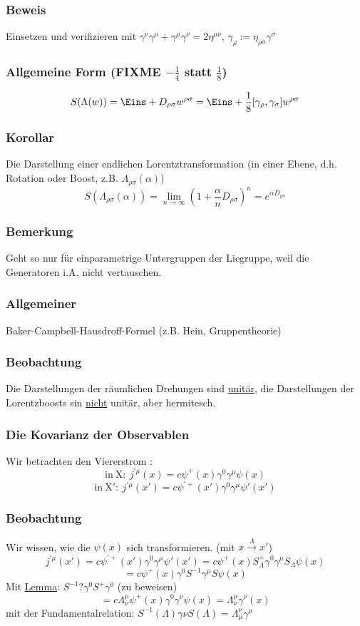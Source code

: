 \documentclass[twoside,a4paper]{scrartcl}
\renewcommand{\1}{\mathds{1}}
\newcommand{\ra}{\rightarrow}
\renewcommand{\L}{\Lambda}
\begin{document}
\subsubsection*{Beweis}
Einsetzen und verifizieren mit $\gamma^\nu\gamma^\mu+\gamma^\mu\gamma^\nu=2\eta^{\mu\nu}$, $\gamma_\rho:=\eta_{\rho\sigma}\gamma^\sigma$
\subsubsection*{Allgemeine Form (FIXME $-\frac{1}{4}$ statt $\frac{1}{8}$)}
$$S(\L(w))=\Eins+D_{\rho\sigma}w^{\rho\sigma}=\Eins+\frac{1}{8}[\gamma_\rho,\gamma_\sigma]w^{\rho\sigma}$$
\subsubsection*{Korollar}
Die Darstellung einer endlichen Lorentztransformation (in einer Ebene, d.h. Rotation oder Boost, z.B. $\L_{\rho\sigma}(\alpha)$)
$$S(\L_{\rho\sigma}(\alpha))=\lim_{n\ra \infty} (1+\frac{\alpha}{n} D_{\rho\sigma})^n=e^{\alpha D_{\rho\sigma}}$$
\subsubsection*{Bemerkung}
Geht so nur für einparametrige Untergruppen der Liegruppe, weil die Generatoren i.A. nicht vertauschen.
\subsubsection*{Allgemeiner}
Baker-Campbell-Hausdroff-Formel (z.B.  Hein, Gruppentheorie)
\subsubsection*{Beobachtung}
Die Darstellungen der räumlichen Drehungen sind \underline{unitär}, die Darstellungen der Lorentzboosts sin \underline{nicht} unitär, aber hermitesch.
\subsubsection{Die Kovarianz der Observablen}
Wir betrachten den Viererstrom :
$$\mathrm{in \ X: \ } j^{'\mu}(x)=c\psi^+(x)\gamma^0 \gamma^\mu \psi(x)$$
$$\mathrm{in \ X': \ } j^{'\mu}(x')=c\psi^{'+}(x')\gamma^0 \gamma^\mu \psi'(x')$$
\subsubsection*{Beobachtung}
Wir wissen, wie die $\psi(x)$ sich transformieren. (mit $x \stackrel{\L}{\ra} x'$)
$$j^{'\mu}(x')=c\psi^{'+}(x')\gamma^0 \gamma^\mu \psi'(x')=c\psi^+(x)S_{\L}^+\gamma^0\gamma^\mu S_{\L}\psi(x)$$
$$=c \psi^+(x)\gamma^0S^{-1}\gamma^\mu S \psi(x)$$
Mit \underline{Lemma}: $S^{-1}?\gamma^0S^+\gamma^0$ (zu beweisen)
$$=c  \L_\nu^\mu\psi^+(x)\gamma^0 \gamma^\nu \psi(x)=\L_\nu^\mu\gamma^\nu(x)$$
mit der Fundamentalrelation: $S^{-1}(\L)\gamma\nu S(\L)=\L_\mu^\nu \gamma^\mu$
\end{document}
